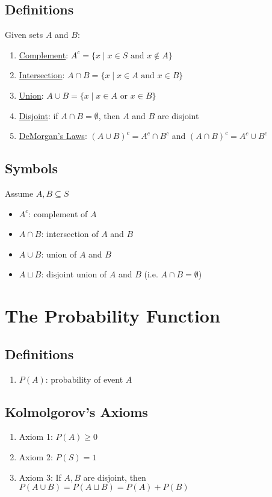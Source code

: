 \documentclass[12pt]{article}
\begin{document}
        \subsection{Definitions}
            Given sets $A$ and $B$:
            \begin{enumerate}
                \item \underline{Complement}: $A^c = \{x \mid x \in S \text{ and } x \notin A\}$
                \item \underline{Intersection}: $A \cap B = \{x \mid x \in A \text{ and } x \in B\}$
                \item \underline{Union}: $A \cup B = \{x \mid x \in A \text{ or } x \in B\}$
                \item \underline{Disjoint}: if $A \cap B = \emptyset$, then $A$ and $B$ are disjoint
                \item \underline{DeMorgan's Laws}: ${(A \cup B)}^c = A^c \cap B^c$ and ${(A \cap B)}^c = A^c \cup B^c$
            \end{enumerate}
        \subsection{Symbols}
            Assume $A, B \subseteq S$
            \begin{itemize}
                \item $A^c$: complement of $A$
                \item $A \cap B$: intersection of $A$ and $B$
                \item $A \cup B$: union of $A$ and $B$
                \item $A \sqcup B$: disjoint union of $A$ and $B$ (i.e. $A \cap B = \emptyset$)
            \end{itemize}
    \section{The Probability Function}
        \subsection{Definitions}
            \begin{enumerate}
                \item \underline{$P(A)$}: probability of event $A$
            \end{enumerate}
        \subsection{Kolmolgorov's Axioms}
            \begin{enumerate}
                \item Axiom 1: $P(A) \geq 0$
                \item Axiom 2: $P(S) = 1$
                \item Axiom 3: If $A, B$ are disjoint, then $P(A \cup B) = P(A \sqcup B) = P(A) + P(B)$
            \end{enumerate}
\end{document}
